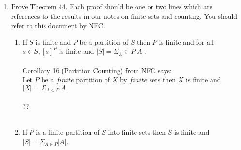 \documentclass[11pt]{article}
\begin{document}
\begin{enumerate}
\newpage %
\item Prove Theorem 44. Each proof should be one or two lines which are references to the results in our notes on finite sets and counting. You should refer to this document by NFC.
\begin{enumerate}
\item If $S$ is finite and $P$ be a partition of $S$ then $P$ is finite and for all $s \in S, [s]^P$ is finite and $|S| = \Sigma_A \in P|A|$.
\\
\\
Corollary 16 (Partition Counting) from NFC says:\\
Let $P$ be a $finite$ partition of $X$ by $finite$ sets then $X$ is finite and $|X| = \Sigma_{A \in P}|A|$
\\
\\
??
\\
\\

\item If $P$ is a finite partition of $S$ into finite sets then $S$ is finite and $|S| = \Sigma_{A \in P}|A|$.
\\
\\
\\
\\
\\
\\
\\

\end{enumerate}


\end{enumerate}
\end{document}
